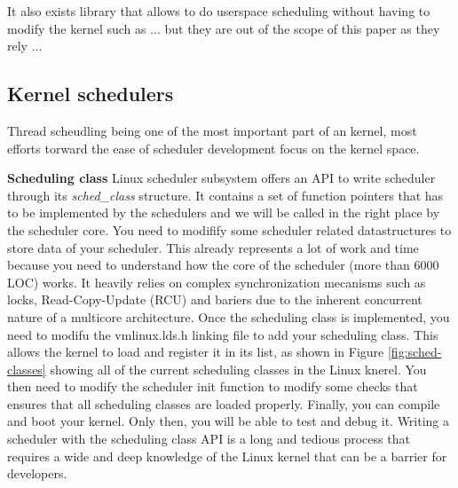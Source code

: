 \par It also exists library that allows to do userspace scheduling without having to modify the kernel such as ... but they are out of the scope of this paper as they rely ...


\subsection{Kernel schedulers}

\par Thread scheudling being one of the most important part of an kernel, most efforts torward the ease of scheduler development focus on the kernel space.\newline

\textbf{Scheduling class} Linux scheduler subsystem offers an API to write scheduler through its \textit{sched\_class} structure. It contains a set of function pointers that has to be implemented by the schedulers and we will be called in the right place by the scheduler core. You need to modifify some scheduler related datastructures to store data of your scheduler. This already represents a lot of work and time because you need to understand how the core of the scheduler (more than 6000 LOC) works. It heavily relies on complex synchronization mecanisms such as locks, Read-Copy-Update (RCU) and bariers due to the inherent concurrent nature of a multicore architecture. Once the scheduling class is implemented, you need to modifu the vmlinux.lds.h linking file to add your scheduling class. This allows the kernel to load and register it in its list, as shown in Figure \ref{fig:sched-classes} showing all of the current scheduling classes in the Linux knerel. You then need to modify the scheduler init function to modify some checks that ensures that all scheduling classes are loaded properly. Finally, you can compile and boot your kernel. Only then, you will be able to test and debug it. Writing a scheduler with the scheduling class API is a long and tedious process that requires a wide and deep knowledge of the Linux kernel that can be a barrier for developers.\newline

